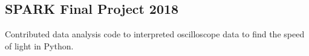 \documentclass[../Resume.tex]{subfiles}
\begin{document}
    \subsection{SPARK Final Project \null\hfill 2018}
    \par Contributed data analysis code to interpreted oscilloscope data to find the speed of light in Python.
    \vspace*{-2mm}
\end{document}
